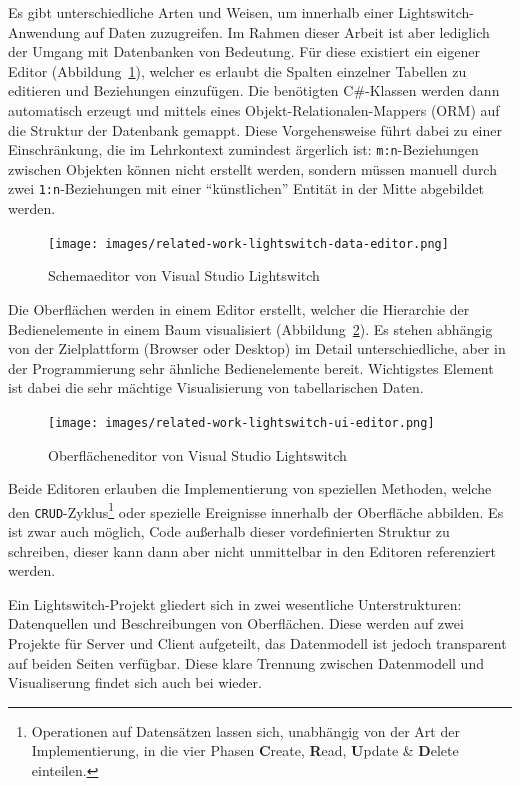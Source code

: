 Es gibt unterschiedliche Arten und Weisen, um innerhalb einer Lightswitch-Anwendung auf Daten zuzugreifen. Im Rahmen dieser Arbeit ist aber lediglich der Umgang mit Datenbanken von Bedeutung. Für diese existiert ein eigener Editor (Abbildung~\ref{fig:lightswitch-data-designer}), welcher es erlaubt die Spalten einzelner Tabellen zu editieren und Beziehungen einzufügen. Die benötigten C\#-Klassen werden dann automatisch erzeugt und mittels eines Objekt-Relationalen-Mappers (ORM) auf die Struktur der Datenbank gemappt. Diese Vorgehensweise führt dabei zu einer Einschränkung, die im Lehrkontext zumindest ärgerlich ist: \lstinline{m:n}-Beziehungen zwischen Objekten können nicht erstellt werden, sondern müssen manuell durch zwei \lstinline{1:n}-Beziehungen mit einer "`künstlichen"' Entität in der Mitte abgebildet werden.

\begin{figure}[p]
  \centering \texttt{[image: images/related-work-lightswitch-data-editor.png]}
  \caption{Schemaeditor von Visual Studio Lightswitch}
  \label{fig:lightswitch-data-designer}
\end{figure}

Die Oberflächen werden in einem Editor erstellt, welcher die Hierarchie der Bedienelemente in einem Baum visualisiert (Abbildung~\ref{fig:lightswitch-ui-designer}). Es stehen abhängig von der Zielplattform (Browser oder Desktop) im Detail unterschiedliche, aber in der Programmierung sehr ähnliche Bedienelemente bereit. Wichtigstes Element ist dabei die sehr mächtige Visualisierung von tabellarischen Daten.

\begin{figure}[p]
  \centering \texttt{[image: images/related-work-lightswitch-ui-editor.png]}
  \caption{Oberflächeneditor von Visual Studio Lightswitch}
  \label{fig:lightswitch-ui-designer}
\end{figure}

Beide Editoren erlauben die Implementierung von speziellen Methoden, welche den \texttt{CRUD}-Zyklus\footnote{Operationen auf Datensätzen lassen sich, unabhängig von der Art der Implementierung, in die vier Phasen \textbf{C}reate, \textbf{R}ead, \textbf{U}pdate \& \textbf{D}elete einteilen.} oder spezielle Ereignisse innerhalb der Oberfläche abbilden. Es ist zwar auch möglich, Code außerhalb dieser vordefinierten Struktur zu schreiben, dieser kann dann aber nicht unmittelbar in den Editoren referenziert werden.

Ein Lightswitch-Projekt gliedert sich in zwei wesentliche Unterstrukturen: Datenquellen und Beschreibungen von Oberflächen. Diese werden auf zwei Projekte für Server und Client aufgeteilt, das Datenmodell ist jedoch transparent auf beiden Seiten verfügbar. Diese klare Trennung zwischen Datenmodell und Visualiserung findet sich auch bei \idename{} wieder.

